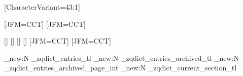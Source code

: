 \usepackage{hyperref}

\usepackage[disablejfam]{luatexja}
\usepackage{luatexja-fontspec}
\usepackage{luatexja-ruby}

\usepackage{expl3}
\usepackage{adjustbox}
\usepackage{calc}
\usepackage{fancyhdr}
\usepackage{ifthen}
\usepackage{mfirstuc}
\usepackage{multicol}
\usepackage{pdfcomment}
\usepackage{pxpic}
\usepackage{enumitem}
\usepackage{titlesec}
\usepackage{xparse}

\usepackage{geometry}

\setmainfont{Junicode}
\setfontfamily{}[CharacterVariant={43:1}]
\setfontfamily{}

[JFM=CCT]
[JFM=CCT]




\newjfontfamily{}[]
\newjfontfamily{}[]
\newjfontfamily{}[]
\newjfontfamily{}[]
\newjfontfamily{}[JFM=CCT]
\newjfontfamily{}[JFM=CCT]

\newcommand{\textJapn}[1]{{%
    \fontMainJapn%
    #1%
  }}
\newcommand{\textKor}[1]{{%
    \fontMainKo
    #1%
  }}
\newcommand{\textHant}[1]{{%
    \fontMainHans%
    #1%
  }}
\newcommand{\textHans}[1]{{%
    \fontMainHans%
    #1%
  }}


\newlength{\EntryDescriptionLineLength}
\newlength{\EntryDescriptionLineHeight}
\newlength{\EntryDescriptionLineIndent}

\providecommand\phantomsection{}

\geometry{top=10mm,headheight=18pt,headsep=2pt,inner=20mm,outer=10mm,textheight=55em}

\ExplSyntaxOn

\tl_new:N \g_zqdict_entries_tl
\tl_new:N \g_zqdict_entries_archived_tl
\int_new:N \g_zqdict_entries_archived_page_int
\tl_new:N \g_zqdict_current_section_tl

